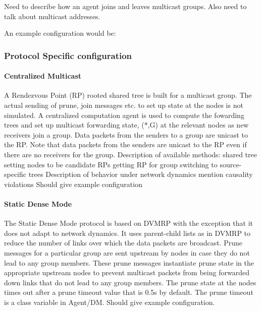 \documentclass{article}
\begin{document}
Need to describe how an agent joins and leaves multicast groups.
Also need to talk about multicast addresses.

An example configuration would be:

\subsubsection{Protocol Specific configuration}

\paragraph{Centralized Multicast}
A Rendezvous Point (RP) rooted shared tree is built
for a multicast group.
The actual sending
of prune, join messages etc.
to set up state at the nodes is not simulated.
A centralized computation agent is used
to compute the fowarding trees and set up 
multicast forwarding state, (*,G) at the relevant nodes
as new receivers join a group.
Data packets from the senders to a group
are unicast to the RP.
Note that data packets
from the senders are unicast to the RP
even if there are no receivers for the group.
Description of available methods:
	shared tree
		setting nodes to be candidate RPs
                getting RP for group
	switching to source-specific trees
Description of behavior under network dynamics
	mention causality violations
Should give example configuration

\paragraph{Static Dense Mode}
The Static Dense Mode protocol 
is based on DVMRP with the exception
that it does not adapt to network dynamics.
It uses parent-child lists as in DVMRP
to reduce the number of links over which the
data packets are broadcast.
Prune messages for a particular group
are sent upstream by nodes in case they do not lead
to any group members.
These prune messages instantiate prune state
in the appropriate upstream nodes to prevent multicast
packets from being forwarded down links
that do not lead to any group members.
The prune state at the nodes times out
after a prune timeout value that is 0.5s by default.
The prune timeout is a class variable in Agent/DM.
Should give example configuration.
\end{document}
